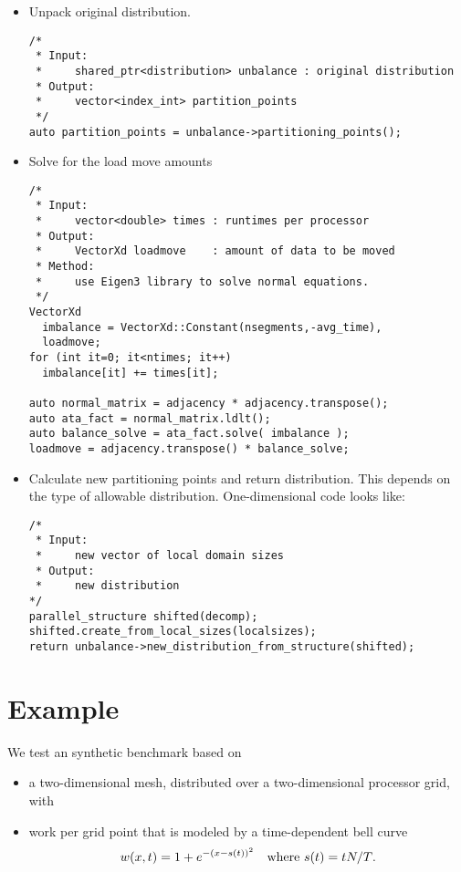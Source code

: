 \documentclass[11pt,fleqn]{article}
\begin{document}
\begin{itemize}
\item Unpack original distribution.
\begin{verbatim}
/*
 * Input:
 *     shared_ptr<distribution> unbalance : original distribution
 * Output:
 *     vector<index_int> partition_points 
 */
auto partition_points = unbalance->partitioning_points();
\end{verbatim}

\item Solve for the load move amounts
\begin{verbatim}
/*
 * Input:
 *     vector<double> times : runtimes per processor
 * Output:
 *     VectorXd loadmove    : amount of data to be moved
 * Method:
 *     use Eigen3 library to solve normal equations.
 */
VectorXd
  imbalance = VectorXd::Constant(nsegments,-avg_time),
  loadmove;
for (int it=0; it<ntimes; it++)
  imbalance[it] += times[it];

auto normal_matrix = adjacency * adjacency.transpose();
auto ata_fact = normal_matrix.ldlt();
auto balance_solve = ata_fact.solve( imbalance );
loadmove = adjacency.transpose() * balance_solve;
\end{verbatim}

\item Calculate new partitioning points and return distribution. This
  depends on the type of allowable distribution. One-dimensional code
  looks like:
\begin{verbatim}
/*
 * Input:
 *     new vector of local domain sizes
 * Output:
 *     new distribution
*/
parallel_structure shifted(decomp);
shifted.create_from_local_sizes(localsizes);
return unbalance->new_distribution_from_structure(shifted);
\end{verbatim}
\end{itemize}

\section{Example}

We test an synthetic benchmark based on
\begin{itemize}
\item a two-dimensional mesh, distributed over a two-dimensional
  processor grid, with
\item work per grid point that is modeled by a time-dependent bell curve
  \[ w(x,t) = 1+e^{-(x-s(t))^2} \quad \hbox{where $s(t)=tN/T$.} \]
\end{itemize}
\end{document}
